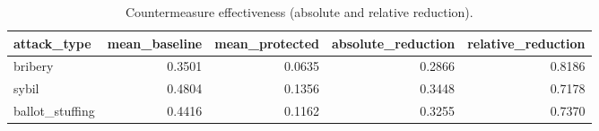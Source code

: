\begin{table}
\caption{Countermeasure effectiveness (absolute and relative reduction).}
\label{tab:countermeasure_effectiveness}
\begin{tabular}{lrrrr}
\toprule
attack\_type & mean\_baseline & mean\_protected & absolute\_reduction & relative\_reduction \\
\midrule
bribery & 0.3501 & 0.0635 & 0.2866 & 0.8186 \\
sybil & 0.4804 & 0.1356 & 0.3448 & 0.7178 \\
ballot\_stuffing & 0.4416 & 0.1162 & 0.3255 & 0.7370 \\
\bottomrule
\end{tabular}
\end{table}
